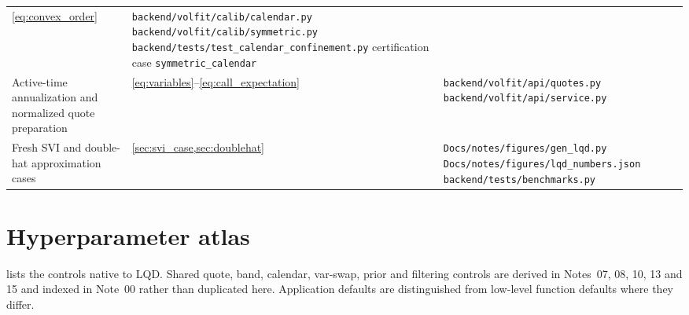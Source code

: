 \documentclass[11pt]{article}
\begin{document}
\begin{longtable}{@{}p{}p{}p{}@{}}
\eqref{eq:convex_order} &
\nolinkurl{backend/volfit/calib/calendar.py}\newline
\nolinkurl{backend/volfit/calib/symmetric.py}\newline
\nolinkurl{backend/tests/test_calendar_confinement.py}\newline
certification case \texttt{symmetric\_calendar}\\
\addlinespace
Active-time annualization and normalized quote preparation &
\eqref{eq:variables}--\eqref{eq:call_expectation} &
\nolinkurl{backend/volfit/api/quotes.py}\newline
\nolinkurl{backend/volfit/api/service.py}\\
\addlinespace
Fresh SVI and double-hat approximation cases &
\cref{sec:svi_case,sec:doublehat} &
\nolinkurl{Docs/notes/figures/gen_lqd.py}\newline
\nolinkurl{Docs/notes/figures/lqd_numbers.json}\newline
\nolinkurl{backend/tests/benchmarks.py}\\
\bottomrule
\end{longtable}
\endgroup

\appendix
\section{Hyperparameter atlas}
\label{app:atlas}

 lists the controls native to LQD.  Shared quote, band,
calendar, var-swap, prior and filtering controls are derived in Notes~07, 08,
10, 13 and 15 and indexed in Note~00 rather than duplicated here.  Application
defaults are distinguished from low-level function defaults where they differ.
\end{document}
